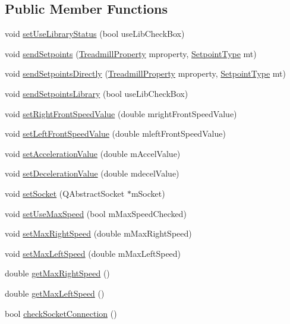 \subsection*{Public Member Functions}
\begin{DoxyCompactItemize}
\item 
void \hyperlink{class_send_setpoints_acb1a31e0cd0938661034d3c1a4dad8c7}{set\+Use\+Library\+Status} (bool use\+Lib\+Check\+Box)
\item 
void \hyperlink{class_send_setpoints_a58e8637367147169467c7d17e1f03947}{send\+Setpoints} (\hyperlink{class_send_setpoints_a1205563976ed70d7beace23697cd0b06}{Treadmill\+Property} mproperty, \hyperlink{class_send_setpoints_a36f865e2cf8a800b6226ff7b6b03abcd}{Setpoint\+Type} mt)
\item 
void \hyperlink{class_send_setpoints_ae4415d646c6de144cad9682b7afa1026}{send\+Setpoints\+Directly} (\hyperlink{class_send_setpoints_a1205563976ed70d7beace23697cd0b06}{Treadmill\+Property} mproperty, \hyperlink{class_send_setpoints_a36f865e2cf8a800b6226ff7b6b03abcd}{Setpoint\+Type} mt)
\item 
void \hyperlink{class_send_setpoints_a8a8b8a1dbc121419b3708f359285394d}{send\+Setpoints\+Library} (bool use\+Lib\+Check\+Box)
\item 
void \hyperlink{class_send_setpoints_ac4a206b4a1b4847749c817bcb473f3bc}{set\+Right\+Front\+Speed\+Value} (double mright\+Front\+Speed\+Value)
\item 
void \hyperlink{class_send_setpoints_af592798b90015754fd11c7ae6493bed7}{set\+Left\+Front\+Speed\+Value} (double mleft\+Front\+Speed\+Value)
\item 
void \hyperlink{class_send_setpoints_a35658d55d1dd98b53515c07eebc107a1}{set\+Acceleration\+Value} (double m\+Accel\+Value)
\item 
void \hyperlink{class_send_setpoints_a5993c64b755726a1b618fba58537aee6}{set\+Deceleration\+Value} (double mdecel\+Value)
\item 
void \hyperlink{class_send_setpoints_a49070309da83f7bab87827915b0524f9}{set\+Socket} (Q\+Abstract\+Socket $\ast$m\+Socket)
\item 
void \hyperlink{class_send_setpoints_a74d189d69d54abd6dd502d6b6dca3cb5}{set\+Use\+Max\+Speed} (bool m\+Max\+Speed\+Checked)
\item 
void \hyperlink{class_send_setpoints_aa053b6ff914fbb8837ff5298f9b4e0f6}{set\+Max\+Right\+Speed} (double m\+Max\+Right\+Speed)
\item 
void \hyperlink{class_send_setpoints_af0a9adc63a95f5c4e3d462862864e0fb}{set\+Max\+Left\+Speed} (double m\+Max\+Left\+Speed)
\item 
double \hyperlink{class_send_setpoints_a5605c2a0ea2e4aa514074aad3ac829c0}{get\+Max\+Right\+Speed} ()
\item 
double \hyperlink{class_send_setpoints_aad40e8adf6a8eb9954ecadaeddab9c87}{get\+Max\+Left\+Speed} ()
\item 
bool \hyperlink{class_send_setpoints_a6adbd2459fda6c6e5fad428656ad68a4}{check\+Socket\+Connection} ()
\end{DoxyCompactItemize}
